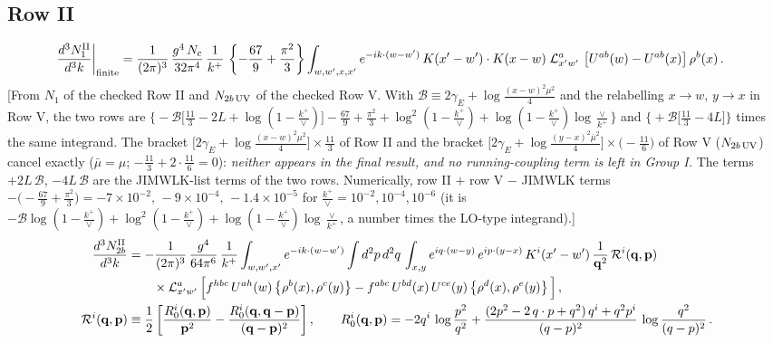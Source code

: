 \documentclass[9pt]{article}
\numberwithin{equation}{section}
\begin{document}
\subsection{Row II}
\begin{align}
\frac{d^{3}N_{1}^{\rm II}}{d^{3}k}\bigg|_{\rm finite} & = \frac{1}{(2\pi)^{3}}\, \frac{g^{4}\,N_{c}}{32\pi^{4}}\,\frac{1}{k^{+}}\,\left\{-\frac{67}{9}+\frac{\pi^{2}}{3}\right\} \int_{w, w',x,x'} e^{-ik\cdot(w-w^\prime)}\, K(x'-w')\cdot K(x-w)\;\mathcal{L}^{a}_{x'w'}\,\left[U^{ab}(w) - U^{ab}(x)\right]\rho^{b}(x)\,.\label{eq:IIa}
\end{align}
{\color{gray}\small [From $N_{1}$ of the checked Row II and $N_{2b\,\rm UV}$ of the checked Row V. With $\mathcal{B}\equiv2\gamma_{E}+\log\frac{(x-w)^{2}\mu^{2}}{4}$ and the relabelling $x\to w$, $y\to x$ in Row V, the two rows are $\big\{-\mathcal{B}\big[\frac{11}{3}-2L+\log(1-\frac{k^{+}}{\vee})\big]-\frac{67}{9}+\frac{\pi^{2}}{3}+\log^{2}(1-\frac{k^{+}}{\vee})+\log(1-\frac{k^{+}}{\vee})\log\frac{\vee}{k^{+}}\big\}$ and $\big\{+\mathcal{B}\big[\frac{11}{3}-4L\big]\big\}$ times the same integrand. The bracket $\big[2\gamma_{E}+\log\frac{(x-w)^{2}\mu^{2}}{4}\big]\times\frac{11}{3}$ of Row II and the bracket $\big[2\gamma_{E}+\log\frac{(y-x)^{2}\bar\mu^{2}}{4}\big]\times\big(-\frac{11}{6}\big)$ of Row V ($N_{2b\,\rm UV}$) cancel exactly ($\bar\mu=\mu$; $-\frac{11}{3}+2\cdot\frac{11}{6}=0$): \emph{neither appears in the final result, and no running-coupling term is left in Group I.} The terms $+2L\,\mathcal{B}$, $-4L\,\mathcal{B}$ are the JIMWLK-list terms of the two rows. Numerically, row II $+$ row V $-$ JIMWLK terms $-\big(-\frac{67}{9}+\frac{\pi^{2}}{3}\big)=-7\times10^{-2},\,-9\times10^{-4},\,-1.4\times10^{-5}$ for $\frac{k^{+}}{\vee}=10^{-2},10^{-4},10^{-6}$ (it is $-\mathcal{B}\log(1-\frac{k^{+}}{\vee})+\log^{2}(1-\frac{k^{+}}{\vee})+\log(1-\frac{k^{+}}{\vee})\log\frac{\vee}{k^{+}}$, a number times the LO-type integrand).]}
\begin{align}
\frac{d^{3}N_{2b}^{\rm II}}{d^{3}k} & = -\frac{1}{(2\pi)^{3}}\,\frac{g^{4}}{64\pi^{6}}\,\frac{1}{k^{+}}\int_{w,w',x'} e^{-ik\cdot(w-w')}
\int d^{2}p\,d^{2}q\,\int_{x,y} e^{iq\cdot(w-y)}\,e^{ip\cdot(y-x)}\,K^{i}(x'-w')\,\frac{1}{\mathbf{q}^{2}}\,\mathcal{R}^{i}(\mathbf{q},\mathbf{p})\notag\\
&\qquad\times\mathcal{L}^{a}_{x'w'}\,
\Big[f^{hbc}\,U^{ah}(w)\left\{\rho^{b}(x),\rho^{c}(y)\right\}-f^{abc}\,U^{bd}(x)\,U^{ce}(y)\left\{\rho^{d}(x),\rho^{e}(y)\right\}\Big]\,,\label{eq:IIb}\\
\mathcal{R}^{i}(\mathbf{q},\mathbf{p})&\equiv\frac12\left[\frac{R^{i}_{0}(\mathbf{q},\mathbf{p})}{\mathbf{p}^{2}}-\frac{R^{i}_{0}(\mathbf{q},\mathbf{q}-\mathbf{p})}{(\mathbf{q}-\mathbf{p})^{2}}\right],\qquad
R^{i}_{0}(\mathbf{q},\mathbf{p}) = -2q^{i}\,\log\frac{p^{2}}{q^{2}}
+\frac{(2p^{2}-2\,q\cdot p+q^{2})\,q^{i}+q^{2}p^{i}}{(q-p)^{2}}\,
\log\frac{q^{2}}{(q-p)^{2}}\,.\notag
\end{align}
\end{document}
